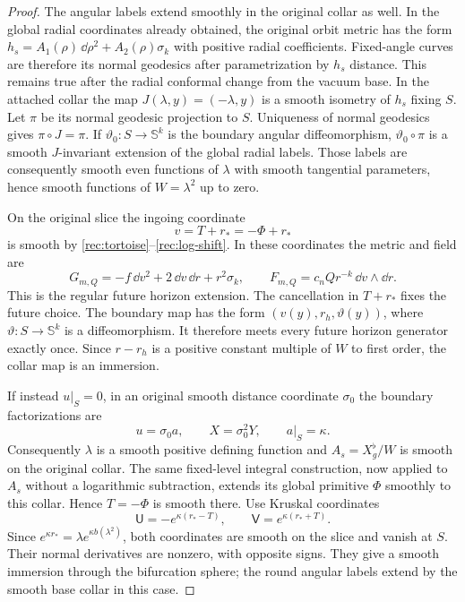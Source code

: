 \begin{proof}
The angular labels extend smoothly in the original collar as well.
In the global radial coordinates already obtained, the original
orbit metric has the form
$h_s=A_1(\rho)\,\dd\rho^2+A_2(\rho)\sigma_k$ with positive
radial coefficients. Fixed-angle curves are therefore its normal
geodesics after parametrization by $h_s$ distance. This remains
true after the radial conformal change from the vacuum base.
In the attached collar the map
$J(\lambda,y)=(-\lambda,y)$ is a smooth isometry of $h_s$
fixing $S$. Let $\pi$ be its normal geodesic projection to $S$.
Uniqueness of normal geodesics gives $\pi\circ J=\pi$.
If $\vartheta_0:S\to\mathbb S^k$ is the boundary angular
diffeomorphism, $\vartheta_0\circ\pi$ is a smooth $J$-invariant
extension of the global radial labels. Those labels are consequently
smooth even functions of $\lambda$ with smooth tangential parameters,
hence smooth functions of $W=\lambda^2$ up to zero.

On the original slice the ingoing coordinate
\[
 v=T+r_*=-\Phi+r_*
\]
is smooth by \eqref{rec:tortoise}--\eqref{rec:log-shift}. In these
coordinates the metric and field are
\begin{equation}\label{rec:ingoing}
 G_{m,Q}=-f\,\dd v^2+2\,\dd v\,\dd r+r^2\sigma_k,
 \qquad F_{m,Q}=c_nQr^{-k}\,\dd v\wedge\dd r.
\end{equation}
This is the regular future horizon extension. The cancellation in
$T+r_*$ fixes the future choice. The boundary map has the form
$(v(y),r_h,\vartheta(y))$, where $\vartheta:S\to\mathbb S^k$
is a diffeomorphism. It therefore meets every future horizon
generator exactly once. Since $r-r_h$ is a positive constant
multiple of $W$ to first order, the collar map is an immersion.

If instead $u|_S=0$, in an original smooth distance coordinate
$\sigma_0$ the boundary factorizations are
\[
 u=\sigma_0 a,\qquad X=\sigma_0^2Y,\qquad a|_S=\kappa.
\]
Consequently $\lambda$ is a smooth positive defining function and
$A_s=X_g^\flat/W$ is smooth on the original collar. The same fixed-level integral construction, now applied to $A_s$
without a logarithmic subtraction, extends its global primitive
$\Phi$ smoothly to this collar. Hence $T=-\Phi$ is smooth there. Use Kruskal
coordinates
\begin{equation}\label{rec:kruskal}
 \mathsf U=-e^{\kappa(r_*-T)},\qquad
 \mathsf V=e^{\kappa(r_*+T)}.
\end{equation}
Since $e^{\kappa r_*}=\lambda e^{\kappa b(\lambda^2)}$,
both coordinates are smooth on the slice and vanish at $S$.
Their normal derivatives are nonzero, with opposite signs.
They give a smooth immersion through the bifurcation sphere; the
round angular labels extend by the smooth base collar in this case.


\end{proof}
